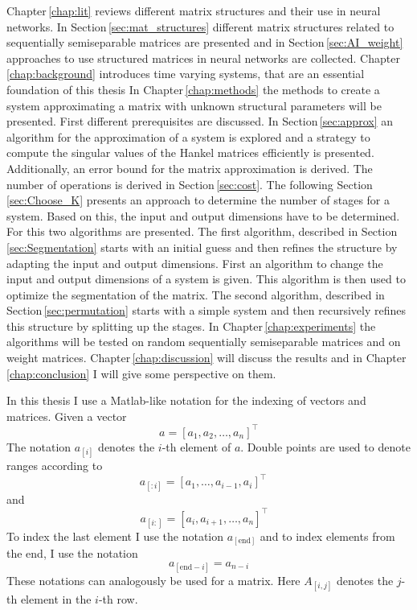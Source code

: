 \documentclass[numbers=noenddot,doctype=mastersthesis,BCOR=15mm,biblatex]{ldvbook}%
\newcommand{\en}{\text{end}}
\begin{document}
Chapter\,\ref{chap:lit} reviews different matrix structures and their use in neural networks.
In Section\,\ref{sec:mat_structures} different matrix structures related to sequentially semiseparable matrices are presented
and in Section\,\ref{sec:AI_weight} approaches to use structured matrices in neural networks are collected.
Chapter\,\ref{chap:background} introduces time varying systems, that are an essential foundation of this thesis
In Chapter\,\ref{chap:methods} the methods to create a system approximating a matrix with unknown structural parameters will be presented.
First different prerequisites are discussed.
In Section\,\ref{sec:approx} an algorithm for the approximation of a system is explored
and a strategy to compute the singular values of the Hankel matrices efficiently is presented.
Additionally, an error bound for the matrix approximation is derived.
The number of operations is derived in Section\,\ref{sec:cost}.
The following Section\,\ref{sec:Choose_K} presents an approach to determine the number of stages for a system.
Based on this, the input and output dimensions have to be determined.
For this two algorithms are presented.
The first algorithm, described in Section\,\ref{sec:Segmentation} starts with an initial guess and then refines the structure by adapting the input and output dimensions.
First an algorithm to change the input and output dimensions of a system is given.
This algorithm is then used to optimize the segmentation of the matrix.
The second algorithm, described in Section\,\ref{sec:permutation} starts with a simple system and then recursively refines this structure by splitting up the stages.
In Chapter\,\ref{chap:experiments} the algorithms will be tested on random sequentially semiseparable matrices and on weight matrices.
Chapter\,\ref{chap:discussion} will discuss the results and in Chapter\,\ref{chap:conclusion} I will give some perspective on them.

In this thesis I use a Matlab-like notation for the indexing of vectors and matrices.
Given a vector 
\begin{equation}
	a = [a_1, a_2, \dots ,a_n]^\top
\end{equation}
The notation $a_{[i]}$ denotes the $i$-th element of $a$.
Double points are used to denote ranges according to
\begin{equation}
a_{[:i]} = [a_1, \dots ,a_{i-1},a_i]^\top\phantom{a_n}
\end{equation}
and 
\begin{equation}
a_{[i:]} = [a_i, a_{i+1}, \dots ,a_n]^\top\phantom{a_i}
\end{equation}
To index the last element I use the notation $a_{[\en]}$ and to index elements from the end, I use the notation 
\begin{equation}
	a_{[\en-i]} = a_{n-i}
\end{equation}
These notations can analogously be used for a matrix. Here $A_{[i,j]}$ denotes the $j$-th element in the $i$-th row.
\end{document}

